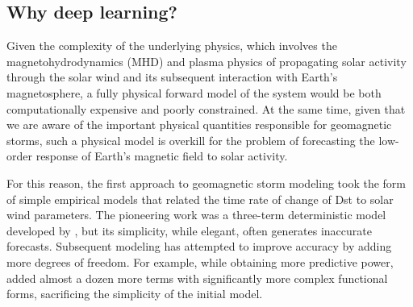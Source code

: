\documentclass[draft,linenumbers]{agujournal2018}
\begin{document}

\subsection{Why deep learning?}
Given the complexity of the underlying physics, which involves the magnetohydrodynamics (MHD) and plasma physics of propagating solar activity through the solar wind and its subsequent interaction with Earth's magnetosphere, a fully physical forward model of the system would be both computationally expensive and poorly constrained. At the same time, given that we are aware of the important physical quantities responsible for geomagnetic storms, such a physical model is overkill for the problem of forecasting the low-order response of Earth's magnetic field to solar activity.

For this reason, the first approach to geomagnetic storm modeling took the form of simple empirical models that related the time rate of change of Dst to solar wind parameters. The pioneering work was a three-term deterministic model developed by \cite{Burton1975}, but its simplicity, while elegant, often generates inaccurate forecasts. Subsequent modeling has attempted to improve accuracy by adding more degrees of freedom. For example, while obtaining more predictive power, \cite{Temerin2006} added almost a dozen more terms with significantly more complex functional forms, sacrificing the simplicity of the initial model. 
\end{document}
